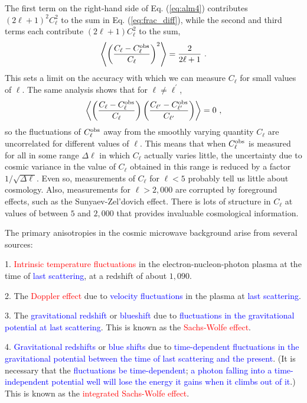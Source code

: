 \documentclass[12pt,a4paper]{article}
\begin{document}
The first term on the right-hand side of Eq. (\ref{eq:alm4}) contributes $(2\ell + 1)^2 C_\ell^2$ to the sum in Eq. (\ref{eq:frac_diff}), while  the second and third terms each contribute $(2\ell + 1)C_\ell^2$ to the sum, 
\begin{equation}
\left\langle \left(\dfrac{C_\ell - C_\ell^{\rm obs}}{C_\ell} \right)^2 \right\rangle = \dfrac{2}{2\ell +1} ~.
\end{equation}
This sets a limit on the accuracy with which we can measure $C_\ell$ for small values of $\ell$. The same analysis shows that for $\ell \neq \ell^\prime$, 
\begin{equation}
\left\langle \left(\dfrac{C_\ell - C_\ell^{\rm obs}}{C_\ell} \right) \left(\dfrac{C_{\ell^\prime} - C_{\ell^\prime}^{\rm obs}}{C_{\ell^\prime}} \right) \right\rangle = 0 ~,
\end{equation}
so the fluctuations of $C_\ell^{\rm obs}$ away from the smoothly varying quantity $C_\ell$ are uncorrelated for different values of $\ell$. This means that when $C_\ell^{\rm obs}$ is measured for all in some range $\Delta \ell$ in which $C_\ell$ actually varies little, the uncertainty due to cosmic variance in the value of $C_\ell$ obtained in this range is reduced by a factor $1/\sqrt{\Delta \ell}$.  Even so, measurements of $C_\ell$ for $\ell < 5$ probably tell us little about cosmology. Also, measurements for $\ell > 2, 000$ are corrupted by foreground effects, such as the Sunyaev-Zel'dovich effect. There is lots of structure in $C_\ell$ at values of between $5$ and $2,000$ that provides invaluable cosmological information.

The primary anisotropies in the cosmic microwave background arise from several sources:

1. \textcolor{red}{Intrinsic temperature fluctuations} in the electron-nucleon-photon plasma at the time of \textcolor{blue}{last scattering}, at a redshift of about $1,090$. 

2. The \textcolor{red}{Doppler effect} due to \textcolor{blue}{velocity fluctuations} in the plasma at \textcolor{blue}{last scattering}.

3. The \textcolor{blue}{gravitational redshift} or \textcolor{blue}{blueshift} due to \textcolor{blue}{fluctuations in the gravitational potential at last scattering}. This is known as the \textcolor{red}{Sachs-Wolfe effect}.

4. \textcolor{blue}{Gravitational redshifts} or \textcolor{blue}{blue shifts} due to \textcolor{blue}{time-dependent fluctuations in the gravitational potential between the time of last scattering and the present}. (It is necessary that the \textcolor{blue}{fluctuations be time-dependent}; \textcolor{blue}{a photon falling into a time-independent potential well will lose the energy it gains when it climbs out of it}.) This is known as the \textcolor{red}{integrated Sachs-Wolfe effect}.
\end{document}
